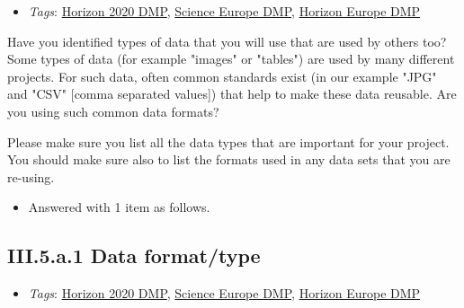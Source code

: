 \documentclass[a4paper,12pt]{report}
\begin{document}
\label{b1df3c74-0b1f-4574-81c4-4cc2d780c1af.b08fe063-33f8-4380-b3a9-ba1e586dedf2}


\begin{itemize}
  \item \textit{Tags}: \ul{Horizon 2020 DMP}, \ul{Science Europe DMP}, \ul{Horizon Europe DMP}
  \end{itemize}


\noindent
\begin{markdown}
Have you identified types of data that you will use that are used by others too? Some types of data (for example "images" or "tables") are used by many different projects. For such data, often common standards exist (in our example "JPG" and "CSV" [comma separated values]) that help to make these data reusable. Are you using such common data formats?

Please make sure you list all the data types that are important for your project. You should make sure also to list the formats used in any data sets that you are re-using.
\end{markdown}


\begin{itemize}
  \item[\ArrowBoldDownRight] Answered with 1 item as follows.
\end{itemize}%
\subsection*{\protect\textcolor{colorSecId}{III.5.a.1} Data format/type}

\label{b1df3c74-0b1f-4574-81c4-4cc2d780c1af.b08fe063-33f8-4380-b3a9-ba1e586dedf2.60574746-e0ce-44c6-8095-a4ed4ebf8d54.f00cf643-5368-458a-97d4-b463c2000c66}


\begin{itemize}
  \item \textit{Tags}: \ul{Horizon 2020 DMP}, \ul{Science Europe DMP}, \ul{Horizon Europe DMP}
  \end{itemize}
\end{document}
